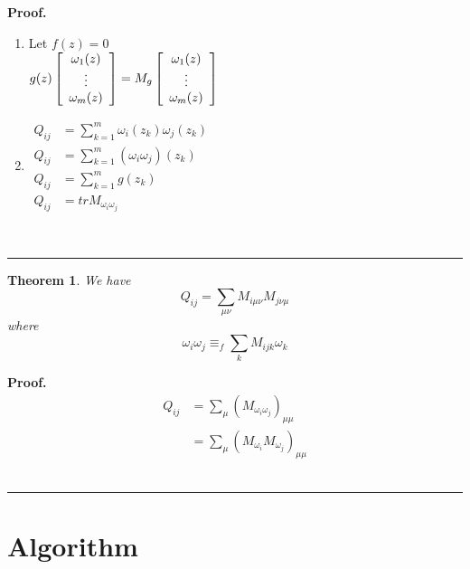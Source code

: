 \documentclass{article}%
\newtheorem{theorem}{Theorem}
\newenvironment{proof}[1][Proof]{\noindent\textbf{#1.} }{\ \rule{0.5em}{0.5em}}
\begin{document}
\begin{proof}
\begin{enumerate}
    \item Let $f(z) = 0$
    \\ $g(z)\left[
\begin{array}
[c]{c}%
\omega_{1}(z)\\
\vdots\\
\omega_{m}(z)%
\end{array}
\right]  = M_{g}\left[
\begin{array}
[c]{c}%
\omega_{1}(z)\\
\vdots\\
\omega_{m}(z)%
\end{array}
\right]$
    \item 
        $\begin{aligned}
             Q_{ij} &= \sum_{k=1}^{m} \omega_{i}(z_k) \omega_{j}(z_k) \\
             Q_{ij} &= \sum_{k=1}^{m} (\omega_{i}\omega_{j})(z_k) \\
             Q_{ij} &= \sum_{k=1}^{m} g(z_k) \\
             Q_{ij} &= trM_{\omega_{i}\omega_{j}}
        \end{aligned}$
\end{enumerate}
\end{proof}

\begin{theorem}
We have%
\[
Q_{ij}=\sum_{\mu\nu}M_{i\mu\nu}M_{j\nu\mu}%
\]
where%
\[
\omega_{i}\omega_{j}\equiv_{f}\sum_{k}M_{ijk}\omega_{k}%
\]
\end{theorem}

\begin{proof}
\begin{equation}
\begin{aligned}
             Q_{ij} &= \sum_{\mu} (M_{\omega_{i} \omega_{j}})_{\mu \mu} \\
             &= \sum_{\mu} (M_{\omega_{i}} M_{\omega_{j}})_{\mu \mu}
\end{aligned}
\end{equation}
\end{proof}



\section{Algorithm}
\end{document}
